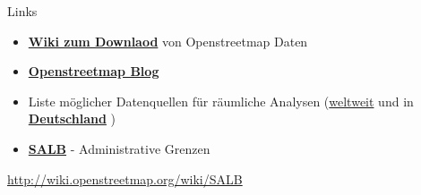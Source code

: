 \documentclass[ignorenonframetext,]{beamer}
\begin{document}
\begin{frame}{Links}

\begin{itemize}
\item
  \href{http://wiki.openstreetmap.org/wiki/Downloading_data}{\textbf{Wiki
  zum Downlaod}} von Openstreetmap Daten
\item
  \href{http://blog.openstreetmap.de/}{\textbf{Openstreetmap Blog}}
\item
  Liste möglicher Datenquellen für räumliche Analysen
  (\href{http://wiki.openstreetmap.org/wiki/Potential_Datasources}{weltweit}
  und in
  \href{http://wiki.openstreetmap.org/wiki/DE:Potential_Datasources}{\textbf{Deutschland}}
  )
\item
  \href{http://wiki.openstreetmap.org/wiki/SALB}{\textbf{SALB}} -
  Administrative Grenzen
\end{itemize}

\url{http://wiki.openstreetmap.org/wiki/SALB}

\end{frame}
\end{document}
